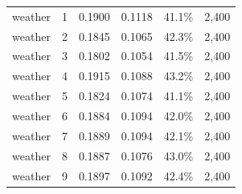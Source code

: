 \begin{longtable}{@{}lrrrrr@{}}
weather & 1 & 0.1900 & 0.1118 & 41.1\% & 2,400 \\
weather & 2 & 0.1845 & 0.1065 & 42.3\% & 2,400 \\
weather & 3 & 0.1802 & 0.1054 & 41.5\% & 2,400 \\
weather & 4 & 0.1915 & 0.1088 & 43.2\% & 2,400 \\
weather & 5 & 0.1824 & 0.1074 & 41.1\% & 2,400 \\
weather & 6 & 0.1884 & 0.1094 & 42.0\% & 2,400 \\
weather & 7 & 0.1889 & 0.1094 & 42.1\% & 2,400 \\
weather & 8 & 0.1887 & 0.1076 & 43.0\% & 2,400 \\
weather & 9 & 0.1897 & 0.1092 & 42.4\% & 2,400 \\
\end{longtable}
